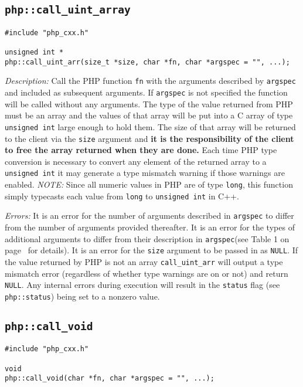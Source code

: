 \documentclass[11pt,titlepage]{article}
\begin{document}
\subsection{\texttt{php::call\_uint\_array}}

\begin{verbatim}
#include "php_cxx.h"

unsigned int *
php::call_uint_arr(size_t *size, char *fn, char *argspec = "", ...);
\end{verbatim}

\emph{Description:} Call the PHP function \verb|fn| with the arguments described by \verb|argspec| and included as subsequent arguments. If \verb|argspec| is not specified the function will be called without any arguments. The type of the value returned from PHP must be an array and the values of that array will be put into a C array of type \verb|unsigned int| large enough to hold them. The size of that array will be returned to the client via the \verb|size| argument and \textbf{it is the responsibility of the client to free the array returned when they are done.} Each time PHP type conversion is necessary to convert any element of the returned array to a \verb|unsigned int| it may generate a type mismatch warning if those warnings are enabled. \emph{NOTE:} Since all numeric values in PHP are of type \verb|long|, this function simply typecasts each value from \verb|long| to \verb|unsigned int| in C++.

\emph{Errors:} It is an error for the number of arguments described in \verb|argspec| to differ from the number of arguments provided thereafter. It is an error for the types of additional arguments to differ from their description in \verb|argspec|(see Table 1 on page~\pageref{Table1} for details). It is an error for the \verb|size| argument to be passed in as \verb|NULL|. If the value returned by PHP is not an array \verb|call_uint_arr| will output a type mismatch error (regardless of whether type warnings are on or not) and return \verb|NULL|. Any internal errors during execution will result in the \verb|status| flag (see \verb|php::status|) being set to a nonzero value.


\subsection{\texttt{php::call\_void}}

\begin{verbatim}
#include "php_cxx.h"

void 
php::call_void(char *fn, char *argspec = "", ...);
\end{verbatim}
\end{document}

